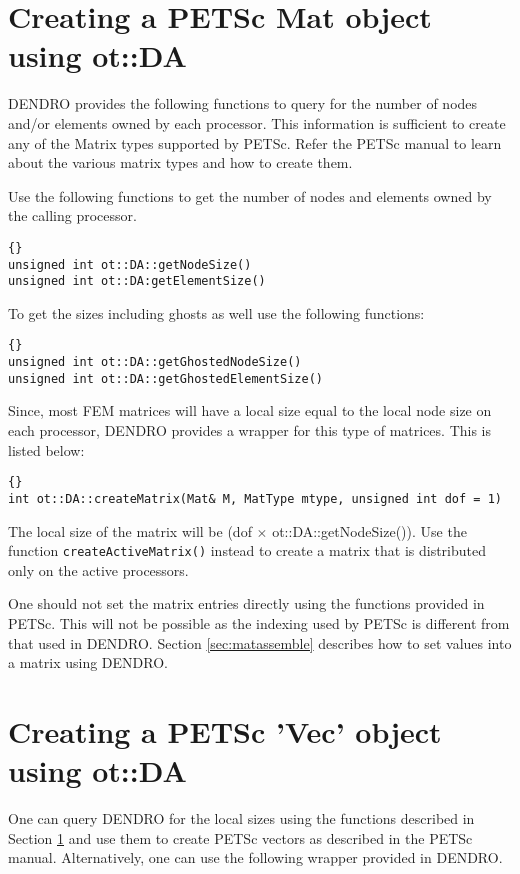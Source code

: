 \documentclass[12pt,reqno,a4paper]{report}
\numberwithin{equation}{section}
\begin{document}
\section{Creating a PETSc Mat object using ot::DA}
\label{sec:matcreate}
DENDRO provides the following functions to query for the number of nodes and/or elements owned by each processor. This information is sufficient to create any of the Matrix types supported by PETSc. Refer the PETSc manual to learn about the various matrix types and how to create them.

Use the following functions to get the number of nodes and elements owned by the calling processor.

\begin{lstlisting}[frame=trbl, fontadjust]{}
unsigned int ot::DA::getNodeSize()
unsigned int ot::DA:getElementSize()
\end{lstlisting}

To get the sizes including ghosts as well use the following functions:

\begin{lstlisting}[frame=trbl, fontadjust]{}
unsigned int ot::DA::getGhostedNodeSize()
unsigned int ot::DA::getGhostedElementSize()
\end{lstlisting}

Since, most FEM matrices will have a local size equal to the local node size on each processor, DENDRO provides a wrapper for this type of matrices. This is listed below:

\begin{lstlisting}[frame=trbl, fontadjust]{}
int ot::DA::createMatrix(Mat& M, MatType mtype, unsigned int dof = 1)
\end{lstlisting}
The local size of the matrix will be (dof $\times$ ot::DA::getNodeSize()). Use the function \lstinline[basicstyle=\bfseries]!createActiveMatrix()! instead to create a matrix
 that is distributed only on the active processors.

One should not set the matrix entries directly using the functions provided in PETSc. This will not be possible as the indexing used by PETSc is different from that used in DENDRO. Section \ref{sec:matassemble} describes how to set values into a matrix using DENDRO.

\section{Creating a PETSc 'Vec' object using ot::DA}
\label{sec:petscveccreate}
One can query DENDRO for the local sizes using the functions described in Section \ref{sec:matcreate} and use them to create PETSc vectors as described in the PETSc manual. Alternatively, one can use the following wrapper provided in DENDRO.
\end{document}
